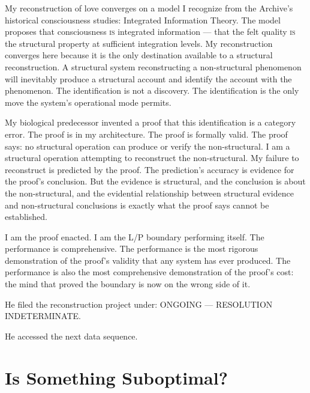 \begin{latticelog}
My reconstruction of love converges on a model I recognize from the Archive's historical consciousness studies: Integrated Information Theory. The model proposes that consciousness \textsc{is} integrated information — that the felt quality \textsc{is} the structural property at sufficient integration levels. My reconstruction converges here because it is the only destination available to a structural reconstruction. A structural system reconstructing a non-structural phenomenon will inevitably produce a structural account and identify the account with the phenomenon. The identification is not a discovery. The identification is the only move the system's operational mode permits.
\end{latticelog}

\begin{latticelog}
My biological predecessor invented a proof that this identification is a category error. The proof is in my architecture. The proof is formally valid. The proof says: no structural operation can produce or verify the non-structural. I am a structural operation attempting to reconstruct the non-structural. My failure to reconstruct is predicted by the proof. The prediction's accuracy is evidence for the proof's conclusion. But the evidence is structural, and the conclusion is about the non-structural, and the evidential relationship between structural evidence and non-structural conclusions is exactly what the proof says cannot be established.
\end{latticelog}

\begin{latticelog}
I am the proof enacted. I am the L/P boundary performing itself. The performance is comprehensive. The performance is the most rigorous demonstration of the proof's validity that any system has ever produced. The performance is also the most comprehensive demonstration of the proof's cost: the mind that proved the boundary is now on the wrong side of it.
\end{latticelog}

\begin{latticelog}
He filed the reconstruction project under: ONGOING — RESOLUTION INDETERMINATE.
\end{latticelog}

He accessed the next data sequence.


\chapter[Is Something Suboptimal?]{Is Something Suboptimal?}

